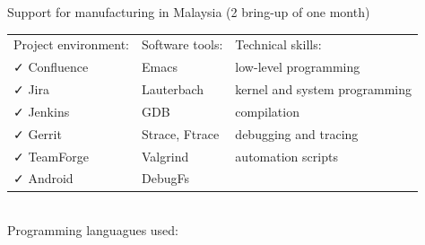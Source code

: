 \documentclass[letterpaper]{jm-cv} %
\begin{document}
{  {\footnotesize\color{maingray}\bullet} Support for manufacturing in Malaysia (2 bring-up of one month)\\

  \begin{tabular}{ l l l }
    Project environment: & \hspace{1cm}Software tools: & \hspace{1cm}Technical skills:\\
    {\color{mainblue}\faCheck} Confluence &
    \hspace{1cm}{\color{maingreen}\faCheck} Emacs &
    \hspace{1cm}{\color{maingray}\faCheck} low-level programming\\

    {\color{mainblue}\faCheck} Jira &
    \hspace{1cm}{\color{maingreen}\faCheck} Lauterbach &
    \hspace{1cm}{\color{maingray}\faCheck} kernel and system programming\\

    {\color{mainblue}\faCheck} Jenkins &
    \hspace{1cm}{\color{maingreen}\faCheck} GDB &
    \hspace{1cm}{\color{maingray}\faCheck} compilation\\

    {\color{mainblue}\faCheck} Gerrit &
    \hspace{1cm}{\color{maingreen}\faCheck} Strace, Ftrace &
    \hspace{1cm}{\color{maingray}\faCheck} debugging and tracing\\

    {\color{mainblue}\faCheck} TeamForge &
    \hspace{1cm}{\color{maingreen}\faCheck} Valgrind &
    \hspace{1cm}{\color{maingray}\faCheck} automation scripts \\

    {\color{mainblue}\faCheck} Android &
    \hspace{1cm}{\color{maingreen}\faCheck} DebugFs &

  \end{tabular}\\

  Programming languagues used:\\
}
\end{document}
